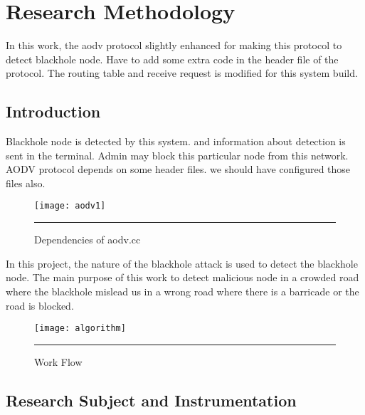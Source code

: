 
\chapter{Research Methodology} %

\label{Chapter3} %


In this work,  the aodv protocol slightly enhanced for making this protocol to detect blackhole node. Have to add some extra code in the header file of the protocol. The routing table and receive request is modified for this system build.



\section{Introduction}

Blackhole node is detected by this system. and information about detection is sent in the terminal. Admin may block this particular node from this network.\\
AODV protocol depends on some header files. we should have configured those files also.
\begin{figure}[htbp]
	\centering
	\texttt{[image: aodv1]}
	\rule{35em}{0.5pt}
	\caption[Dependencies of aodv.cc]{Dependencies of aodv.cc}
	\label{Dependencies of aodv.cc}
\end{figure}
\pagebreak
In this project, the nature of the blackhole attack is used to detect the blackhole node.
The main purpose of this work to detect malicious node in a crowded road where the blackhole mislead us in a wrong road where there is a barricade or the road is blocked.

\begin{figure}[htbp]
	\centering
	\texttt{[image: algorithm]}
	\rule{35em}{0.5pt}
	\caption[Algorithm Of Work]{Work Flow}
	\label{flow}
\end{figure}

\section{Research Subject and Instrumentation}

